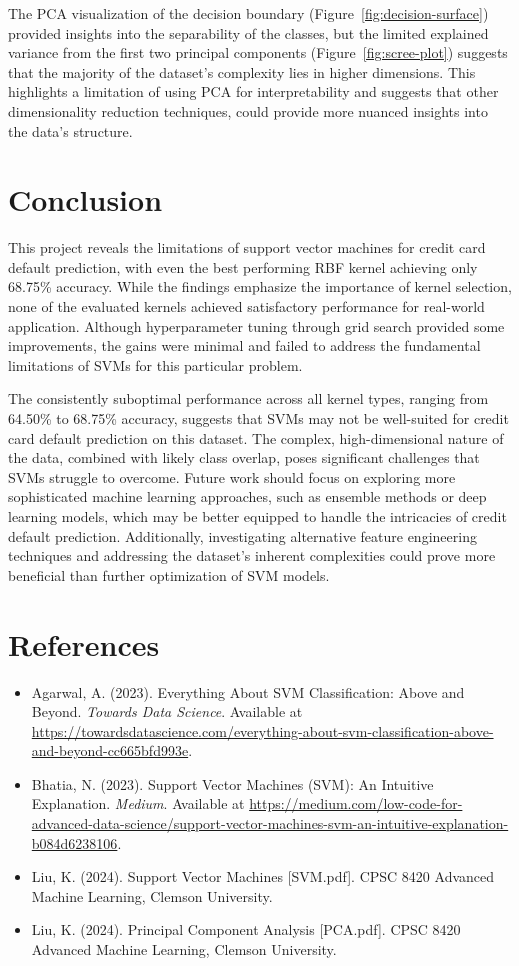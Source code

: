\documentclass{article}
\begin{document}
The PCA visualization of the decision boundary (Figure~\ref{fig:decision-surface}) provided insights into the separability of the classes, but the limited explained variance from the first two principal components (Figure~\ref{fig:scree-plot}) 
suggests that the majority of the dataset's complexity lies in higher dimensions. This highlights a limitation of using PCA for interpretability and suggests that other dimensionality reduction techniques, could provide more nuanced insights into the data's structure.

\section{Conclusion}
This project reveals the limitations of support vector machines for credit card default prediction, with even the best performing RBF kernel achieving only 68.75\% accuracy. While the findings emphasize the importance of kernel selection, none of the evaluated kernels 
achieved satisfactory performance for real-world application. Although hyperparameter tuning through grid search provided some improvements, the gains were minimal and failed to address the fundamental limitations of SVMs for this particular problem.

The consistently suboptimal performance across all kernel types, ranging from 64.50\% to 68.75\% accuracy, suggests that SVMs may not be well-suited for credit card default prediction on this dataset. The complex, high-dimensional nature of the data, 
combined with likely class overlap, poses significant challenges that SVMs struggle to overcome. Future work should focus on exploring more sophisticated machine learning approaches, such as ensemble methods or deep learning models, which may be better equipped to 
handle the intricacies of credit default prediction. Additionally, investigating alternative feature engineering techniques and addressing the dataset's inherent complexities could prove more beneficial than further optimization of SVM models.

\section*{References}
\begin{itemize}
    \item Agarwal, A. (2023). Everything About SVM Classification: Above and Beyond. \textit{Towards Data Science}. Available at \url{https://towardsdatascience.com/everything-about-svm-classification-above-and-beyond-cc665bfd993e}.
    \item Bhatia, N. (2023). Support Vector Machines (SVM): An Intuitive Explanation. \textit{Medium}. Available at \url{https://medium.com/low-code-for-advanced-data-science/support-vector-machines-svm-an-intuitive-explanation-b084d6238106}.
    \item Liu, K. (2024). Support Vector Machines [SVM.pdf]. CPSC 8420 Advanced Machine Learning, Clemson University.
    \item Liu, K. (2024). Principal Component Analysis [PCA.pdf]. CPSC 8420 Advanced Machine Learning, Clemson University.
\end{itemize}
\end{document}
